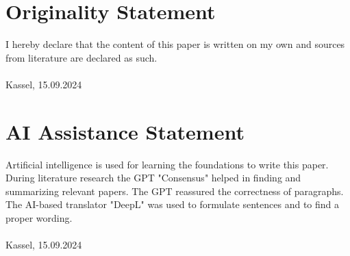 \section{Originality Statement}
I hereby declare that the content of this paper is written on my own and sources from literature are declared as such.\vspace{2cm}\\
\underline{\hspace{10cm}}\\
\footnotesize Kassel, 15.09.2024 \normalsize
\section{AI Assistance Statement}
Artificial intelligence is used for learning the foundations to write this paper. During literature research the GPT "Consensus" helped in finding and summarizing relevant papers. The GPT reassured the correctness of paragraphs. The AI-based translator "DeepL" was used to formulate sentences and to find a proper wording.\vspace{2cm}\\
\underline{\hspace{10cm}}\\
\footnotesize Kassel, 15.09.2024 \normalsize
